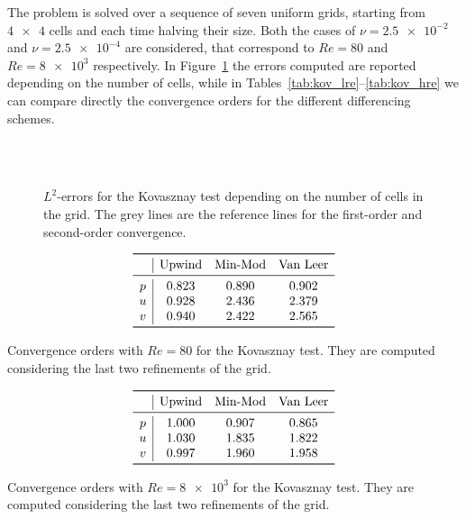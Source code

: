 The problem is solved over a sequence of seven uniform grids, starting from 
$\num{4x4}$ cells and each time halving their size. Both the cases of 
$\nu=\num{2.5e-2}$ and $\nu=\num{2.5e-4}$ are considered, that correspond to 
$Re=80$ and $Re=\num{8e3}$ respectively. In Figure~\ref{fig:kov_err} the errors 
computed are reported depending on the number of cells, while in 
Tables~\ref{tab:kov_lre}--\ref{tab:kov_hre} we can compare directly the 
convergence orders for the different differencing schemes.
\begin{figure}
	\centering
	\subfloat[Upwind, $Re = 80$]{
		}
	\subfloat[Upwind, $Re = \num{8e3}$]{
		}\\
	\subfloat[Min-Mod, $Re = 80$]{
		}
	\subfloat[Min-Mod, $Re = \num{8e3}$]{
		}\\
	\subfloat[Van Leer, $Re = 80$]{
		}
	\subfloat[Van Leer, $Re = \num{8e3}$]{
		}
	\caption[$L^2$-errors for the Kovasznay test]{$L^2$-errors for the 
	Kovasznay test depending on the number of cells in the grid. The grey 
	lines are the reference lines for the first-order and second-order 
	convergence.}
	\label{fig:kov_err}
\end{figure}
\begin{table}
	\centering
	\[
	\begin{array}{c|ccc}
	\toprule
	& \text{Upwind} & \text{Min-Mod} & \text{Van Leer} \\ 
	\midrule
	p & 0.823 & 0.890 & 0.902\\
	u & 0.928 & 2.436 & 2.379\\
	v & 0.940 & 2.422 & 2.565\\
	\bottomrule
	\end{array}
	\]
	\caption[Convergence orders with $Re = 80$ for the Kovasznay 
	test]{Convergence orders with $Re = 80$ for the Kovasznay test. They 
	are computed considering the last two refinements of the grid.}
	\label{tab:kov_lre}
	\[
	\begin{array}{c|ccc}
	\toprule
	& \text{Upwind} & \text{Min-Mod} & \text{Van Leer} \\ 
	\midrule
	p & 1.000 & 0.907 & 0.865\\
	u & 1.030 & 1.835 & 1.822\\
	v & 0.997 & 1.960 & 1.958\\
	\bottomrule
	\end{array}
	\]
	\caption[Convergence orders with $Re = \num{8e3}$ for the Kovasznay 
	test]{Convergence orders with $Re = \num{8e3}$ for the Kovasznay 
	test. They are computed considering the last two refinements of the 
	grid.}
	\label{tab:kov_hre}
\end{table}

